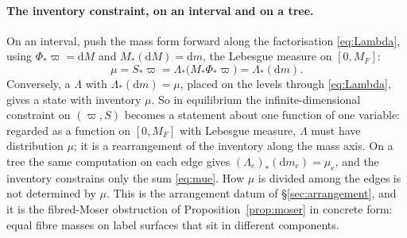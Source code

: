 \documentclass[11pt]{article}
\theoremstyle{definition}
\theoremstyle{remark}
\begin{document}
\paragraph{The inventory constraint, on an interval and on a tree.} On
an interval, push the mass form forward along the factorisation
\eqref{eq:Lambda}, using $\Phi_*\varpi = \mathrm dM$ and $M_*(\mathrm
dM) = \mathrm dm$, the Lebesgue measure on $[0, M_F]$:
\begin{equation}
  \mu = S_*\varpi = \Lambda_*\bigl(M_*\Phi_*\varpi\bigr) = \Lambda_*(\mathrm dm) .
  \label{eq:Lambdadist}
\end{equation}
Conversely, a $\Lambda$ with $\Lambda_*(\mathrm dm) = \mu$, placed on the
levels through \eqref{eq:Lambda}, gives a state with inventory $\mu$.
So in equilibrium the infinite-dimensional constraint on $(\varpi, S)$
becomes a statement about one function of one variable: regarded as a
function on $[0, M_F]$ with Lebesgue measure, $\Lambda$ must have
distribution $\mu$; it is a rearrangement of the inventory along the
mass axis. On a tree the same computation on each edge gives
$(\Lambda_e)_*(\mathrm dm_e) = \mu_e$, and the inventory constrains
only the sum \eqref{eq:mue}. How $\mu$ is divided among the edges is
not determined by $\mu$. This is the arrangement datum of
\S\ref{sec:arrangement}, and it is the fibred-Moser obstruction of
Proposition~\ref{prop:moser} in concrete form: equal fibre masses on
label surfaces that sit in different components.
\end{document}
